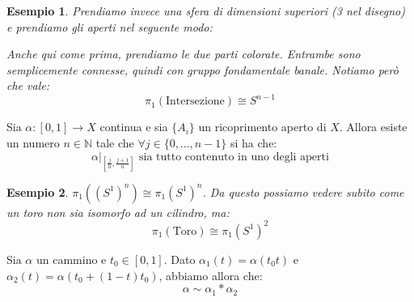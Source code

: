 \documentclass[11pt,a4paper,twoside]{article}
\newtheorem{es}{Esempio}
\theoremstyle{definition}
\begin{document}
\begin{es}
	Prendiamo invece una sfera di dimensioni superiori (3 nel disegno) e prendiamo gli aperti nel seguente modo:
	\begin{center}
	\end{center}
	Anche qui come prima, prendiamo le due parti colorate. Entrambe sono semplicemente connesse, quindi con gruppo fondamentale banale. Notiamo però che vale:
	\[ \pi_1(\text{Intersezione}) \cong S^{n-1} \]
\end{es}

\begin{lemma}{}{}\label{fatto2}
	Sia $\alpha:[0,1] \to X$ continua e sia $\{A_i\}$ un ricoprimento aperto di $X$. Allora esiste un numero $n \in \mathbb N$ tale che $\forall j \in \{0,...,n-1\}$ si ha che:
	\[ \left.\alpha\right|_{[\frac jn, \frac{j+1}n]} \text{ sia tutto contenuto in uno degli aperti} \]
\end{lemma}

\begin{es}
	$\pi_1((S^1)^n) \cong \pi_1(S^1)^n$. Da questo possiamo vedere subito come un toro non sia isomorfo ad un cilindro, ma:
	\[ \pi_1(\text{Toro}) \cong \pi_1(S^1)^2 \]
\end{es}

\begin{lemma}{}{}\label{fatto3}
	Sia $\alpha$ un cammino e $t_0 \in [0,1]$. Dato $\alpha_1(t) = \alpha(t_0t)$ e $\alpha_2(t) = \alpha(t_0 + (1-t)t_0)$, abbiamo allora che:
	\[ \alpha \sim \alpha_1 * \alpha_2 \]
\end{lemma}
\end{document}
